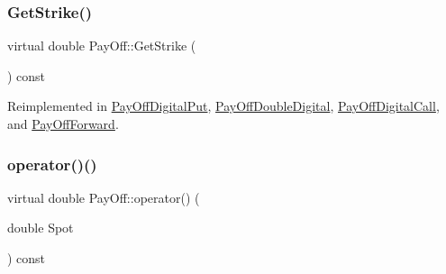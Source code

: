 \hypertarget{classPayOff_aa7a2451e286496c8d5a153000a818d34}{}\label{classPayOff_aa7a2451e286496c8d5a153000a818d34} 
\subsubsection{\texorpdfstring{Get\+Strike()}{GetStrike()}}
{\footnotesize\ttfamily virtual double Pay\+Off\+::\+Get\+Strike (\begin{DoxyParamCaption}{ }\end{DoxyParamCaption}) const\hspace{0.3cm}{\ttfamily [virtual]}}



Reimplemented in \hyperlink{classPayOffDigitalPut_acd323410d45f6c99a532116f8fbfbc02}{Pay\+Off\+Digital\+Put}, \hyperlink{classPayOffDoubleDigital_a58e92fda1c78721ff68494aafd42616e}{Pay\+Off\+Double\+Digital}, \hyperlink{classPayOffDigitalCall_ad8953d367e291925ab5d963f57ed35bc}{Pay\+Off\+Digital\+Call}, and \hyperlink{classPayOffForward_aa485cf251b7121a71396d3f107b35ff9}{Pay\+Off\+Forward}.

\hypertarget{classPayOff_a5ae17d82c233ef5568c8fb0539703000}{}\label{classPayOff_a5ae17d82c233ef5568c8fb0539703000} 
\subsubsection{\texorpdfstring{operator()()}{operator()()}\hspace{0.1cm}{\footnotesize\ttfamily [1/3]}}
{\footnotesize\ttfamily virtual double Pay\+Off\+::operator() (\begin{DoxyParamCaption}\item[{double}]{Spot }\end{DoxyParamCaption}) const\hspace{0.3cm}{\ttfamily [pure virtual]}}




